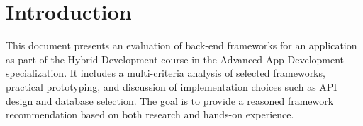 \section{Introduction}
This document presents an evaluation of back-end frameworks for an application as part of the Hybrid Development course in the Advanced App Development specialization.
It includes a multi-criteria analysis of selected frameworks, practical prototyping, and discussion of implementation choices such as API design and database selection.
The goal is to provide a reasoned framework recommendation based on both research and hands-on experience.
